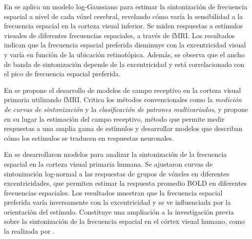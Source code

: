 En \cite{aghajari_population_2020} se aplica un modelo log-Gaussiano para estimar la sintonización de frecuencia espacial a nivel de cada vóxel cerebral, revelando cómo varía la sensibilidad a la frecuencia espacial en la corteza visual inferior. Se miden respuestas a estímulos visuales de diferentes frecuencias espaciales, a trav\'es de fMRI. Los resultados indican que la frecuencia espacial preferida disminuye con la excentricidad visual y varía en función de la ubicación retinotópica. Además, se observa que el ancho de banda de sintonización depende de la excentricidad y está correlacionado con el pico de frecuencia espacial preferida.

En \cite{kriegeskorte_understanding_2011} se propone el desarrollo de modelos de campo receptivo en la corteza visual primaria utilizando fMRI. Critica los métodos convencionales como la \textit{medición de curvas de sintonización} y la \textit{clasificación de patrones multivariados}, y propone en su lugar la estimación del campo receptivo, método que permite medir respuestas a una amplia gama de estímulos y desarrollar modelos que describan cómo los estímulos se traducen en respuestas neuronales.

En \cite{broderick_mapping_2022} se desarrollaron modelos para analizar la sintonización de la frecuencia espacial en la corteza visual primaria humana. Se ajustaron curvas de sintonización log-normal a las respuestas de grupos de vóxeles en diferentes excentricidades, que permiten estimar la respuesta promedio BOLD en diferentes frecuencias espaciales. Los resultados muestran que la frecuencia espacial preferida varía inversamente con la excentricidad y se ve influenciada por la orientación del estímulo. Constituye una ampliaci\'on a la investigación previa sobre la sintonización de la frecuencia espacial en el córtex visual humano, como la realizada por \cite{aghajari_population_2020}. 






